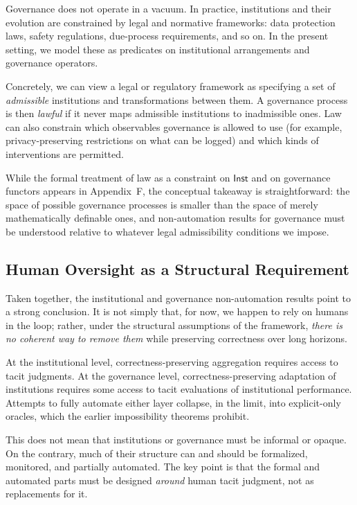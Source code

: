 \documentclass[11pt]{article}
\theoremstyle{definition}
\newcommand{\Inst}{\mathsf{Inst}}
\begin{document}
Governance does not operate in a vacuum. In practice, institutions and their evolution are constrained by legal and normative frameworks: data protection laws, safety regulations, due-process requirements, and so on. In the present setting, we model these as predicates on institutional arrangements and governance operators.

Concretely, we can view a legal or regulatory framework as specifying a set of \emph{admissible} institutions and transformations between them. A governance process is then \emph{lawful} if it never maps admissible institutions to inadmissible ones. Law can also constrain which observables governance is allowed to use (for example, privacy-preserving restrictions on what can be logged) and which kinds of interventions are permitted.

While the formal treatment of law as a constraint on $\Inst$ and on governance functors appears in Appendix~F, the conceptual takeaway is straightforward: the space of possible governance processes is smaller than the space of merely mathematically definable ones, and non-automation results for governance must be understood relative to whatever legal admissibility conditions we impose.

\subsection{Human Oversight as a Structural Requirement}

Taken together, the institutional and governance non-automation results point to a strong conclusion. It is not simply that, for now, we happen to rely on humans in the loop; rather, under the structural assumptions of the framework, \emph{there is no coherent way to remove them} while preserving correctness over long horizons.

At the institutional level, correctness-preserving aggregation requires access to tacit judgments. At the governance level, correctness-preserving adaptation of institutions requires some access to tacit evaluations of institutional performance. Attempts to fully automate either layer collapse, in the limit, into explicit-only oracles, which the earlier impossibility theorems prohibit.

This does not mean that institutions or governance must be informal or opaque. On the contrary, much of their structure can and should be formalized, monitored, and partially automated. The key point is that the formal and automated parts must be designed \emph{around} human tacit judgment, not as replacements for it.
\end{document}
